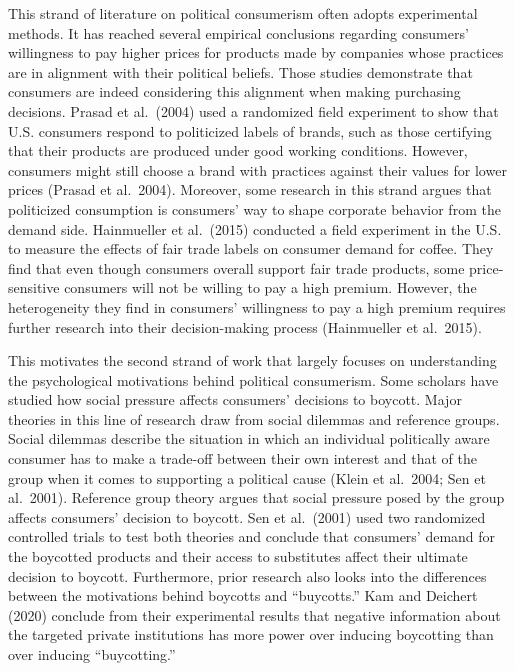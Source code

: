 \documentclass[letterpaper, 12pt]{article}
\begin{document}
This strand of literature on political consumerism often adopts experimental methods. It has reached several empirical conclusions regarding consumers' willingness to pay higher prices for products made by companies whose practices are in alignment with their political beliefs. Those studies demonstrate that consumers are indeed considering this alignment when making purchasing decisions. Prasad et al.\ (2004) used a randomized field experiment to show that U.S. consumers respond to politicized labels of brands, such as those certifying that their products are produced under good working conditions. However, consumers might still choose a brand with practices against their values for lower prices (Prasad et al.\ 2004). Moreover, some research in this strand argues that politicized consumption is consumers' way to shape corporate behavior from the demand side. Hainmueller et al.\ (2015) conducted a field experiment in the U.S. to measure the effects of fair trade labels on consumer demand for coffee. They find that even though consumers overall support fair trade products, some price-sensitive consumers will not be willing to pay a high premium. However, the heterogeneity they find in consumers' willingness to pay a high premium requires further research into their decision-making process (Hainmueller et al.\ 2015).

This motivates the second strand of work that largely focuses on understanding the psychological motivations behind political consumerism. Some scholars have studied how social pressure affects consumers' decisions to boycott. Major theories in this line of research draw from social dilemmas and reference groups. Social dilemmas describe the situation in which an individual politically aware consumer has to make a trade-off between their own interest and that of the group when it comes to supporting a political cause (Klein et al.\ 2004; Sen et al.\ 2001). Reference group theory argues that social pressure posed by the group affects consumers' decision to boycott. Sen et al.\ (2001) used two randomized controlled trials to test both theories and conclude that consumers' demand for the boycotted products and their access to substitutes affect their ultimate decision to boycott. Furthermore, prior research also looks into the differences between the motivations behind boycotts and ``buycotts.'' Kam and Deichert (2020) conclude from their experimental results that negative information about the targeted private institutions has more power over inducing boycotting than over inducing ``buycotting.''
\end{document}

